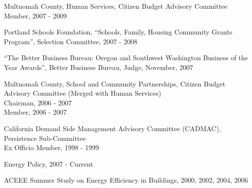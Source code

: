 \documentclass[Computer Science]{vita}
\begin{document}
\begin{vita}
\begin{Professional and Service Activities}
\begin{Community}
    \item Multnomah County, Human Services, Citizen Budget Advisory
      Committee\\Member, 2007 - 2009

    \item Portland Schools Foundation, ``Schools, Family, Housing
      Community Grants Program'', Selection Committee, 2007 - 2008

    \item ``The Better Business Bureau: Oregon and Southwest
      Washington Business of the Year Awards'', Better Business
      Bureau, Judge, November, 2007


    \item Multnomah County, School and Community Partnerships, Citizen Budget Advisory Committee (Merged with Human Services)\\
      Chairman, 2006 - 2007\\
      Member, 2006 - 2007
	
    \item California Demand Side Management Advisory Committee (CADMAC), Persistence Sub-Committee\\
      Ex Officio Member, 1998 - 1999

    \end{Community}
    \begin{Journal Article and Paper Review}

    \item Energy Policy, 2007 - Current
    \item ACEEE Summer Study on Energy Efficiency in Buildings, 2000,
      2002, 2004, 2006
  \end{Journal Article and Paper Review}

  \end{Professional and Service Activities}


% 
% 

\end{vita}
\end{document}

